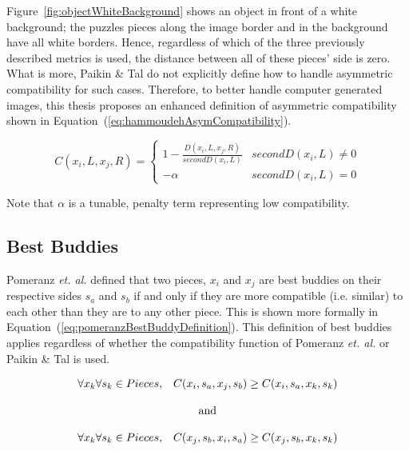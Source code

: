 \documentclass{report}
\def\eref#1{(\ref{#1})}
\begin{document}
Figure~\ref{fig:objectWhiteBackground} shows an object in front of a white background; the puzzles pieces along the image border and in the background have all white borders.  Hence, regardless of which of the three previously described metrics is used, the distance between all of these pieces' side is zero.  What is more, Paikin \& Tal do not explicitly define how to handle asymmetric compatibility for such cases.  Therefore, to better handle computer generated images, this thesis proposes an enhanced definition of asymmetric compatibility shown in Equation~\eref{eq:hammoudehAsymCompatibility}.  

\begin{equation} \label{eq:hammoudehAsymCompatibility}
C(x_i,L,x_j,R)= \begin{cases} 
	1 - \frac{D(x_i,L,x_j,R)}{secondD(x_i,L)} & secondD(x_i,L) \ne 0
\\
	-\alpha & secondD(x_i,L) = 0
\end{cases} 
\end{equation}

\noindent
Note that $\alpha$ is a tunable, penalty term representing low compatibility.


\subsection{Best Buddies}\label{sec:bestBuddies}

Pomeranz \textit{et. al.} defined that two pieces, $x_i$ and $x_j$ are best buddies on their respective sides $s_a$ and $s_b$ if and only if they are more compatible (i.e. similar) to each other than they are to any other piece.  This is shown more formally in Equation~\eref{eq:pomeranzBestBuddyDefinition}.  This definition of best buddies applies regardless of whether the compatibility function of Pomeranz \textit{et. al.} or Paikin \& Tal is used.

\begin{equation} \label{eq:pomeranzBestBuddyDefinition}
\begin{split}
\begin{matrix}
\forall{x_k} \forall{s_k} \in {Pieces}, & C(x_i, s_a, x_j, s_b) \geq C(x_i, s_a, x_k, s_k)
\\
\\
\multicolumn{2}{c}{\textnormal{and}}
\\
\\
\forall{x_k} \forall{s_k} \in {Pieces}, & C(x_j, s_b, x_i, s_a) \geq C(x_j, s_b, x_k, s_k)
\end{matrix}
\end{split}
\end{equation}
\end{document}
